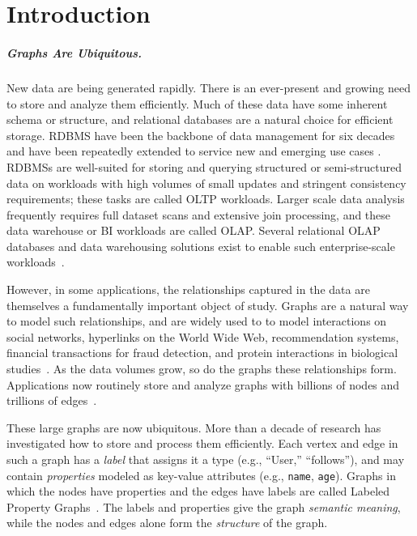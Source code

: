 \chapter{Introduction}
\label{sec:intro}

\paragraph{Graphs Are Ubiquitous.}
\label{sec:intro:ubiquitous}

New data are being generated rapidly. There is an ever-present and growing need to store and analyze them efficiently.
Much of these data have some inherent schema or structure, and relational databases are a natural choice for efficient storage.
\ac{RDBMS} have been the backbone of data management for six decades and have been repeatedly extended to service new and emerging use cases \cite{stonebraker2018c,boncz2005monetdb, HStore2008Abadi, stonebraker2013voltdb,PASE2020:pgvector}.
RDBMSs are well-suited for storing and querying structured or semi-structured data on workloads with high volumes of small updates and stringent consistency requirements; these tasks are called \ac{OLTP} workloads.
Larger scale data analysis frequently requires full dataset scans and extensive join processing, and these data warehouse or \ac{BI} workloads are called \ac{OLAP}.
Several relational OLAP databases and data warehousing solutions exist to enable such enterprise-scale workloads~\cite{Redshift2015,boncz2005monetdb,vertica, raasveldt2019duckdb}.

However, in some applications, the relationships captured in the data are themselves a fundamentally important object of study.
Graphs are a natural way to model such relationships, and are widely used to to model interactions on social networks, hyperlinks on the World Wide Web, recommendation systems, financial transactions for fraud detection, and protein interactions in biological studies~\cite{ubiquityLargeGraphsVLDB2017}.
As the data volumes grow, so do the graphs these relationships form.
Applications now routinely store and analyze graphs with billions of nodes and trillions of edges~\cite{ching2015oneTrillion,besta2020demystifying, lin2018shentu, gupta2024graphscale, zhou2025redtao}.

These large graphs are now ubiquitous. More than a decade of research has investigated how to store and process them efficiently.
Each vertex and edge in such a graph has a \emph{label} that assigns it a type (e.g., ``User,'' ``follows''), and may contain \emph{properties} modeled as key-value attributes (e.g., \texttt{name}, \texttt{age}).
Graphs in which the nodes have properties and the edges have labels are called Labeled Property Graphs~\cite{besta2020demystifying}.
The labels and properties give the graph \emph{semantic meaning}, while the nodes and edges alone form the \emph{structure} of the graph.

